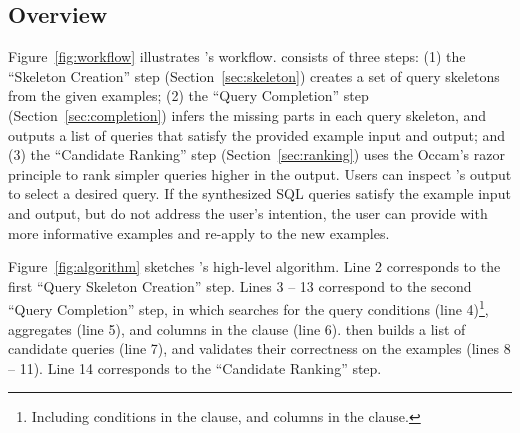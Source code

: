 \subsection{Overview}
\label{sec:algorithm}

\vspace{-1mm}

Figure~\ref{fig:workflow} illustrates \ourtool's workflow.
\ourtool consists of three steps: (1) the ``Skeleton Creation'' step (Section~\ref{sec:skeleton})
creates a set of query skeletons from the given examples;
(2) the ``Query Completion'' step (Section~\ref{sec:completion}) 
infers the missing parts in each query skeleton, and outputs
a list of queries that satisfy
the provided example input and output; and (3) the ``Candidate Ranking'' step (Section~\ref{sec:ranking}) uses the Occam's razor
principle to rank simpler queries higher in the output.
Users can inspect \ourtool's output to select a desired query.
If the synthesized SQL queries satisfy the example input and
output, but do not address the user's intention,
the user can provide \ourtool with more informative examples
and re-apply \ourtool to the new examples.


Figure~\ref{fig:algorithm} sketches \ourtool's high-level algorithm.
Line 2 corresponds to the first ``Query Skeleton
Creation'' step. Lines 3 -- 13 correspond to the second ``Query Completion''
step, in which \ourtool searches for the query conditions (line 4)\footnote{
Including conditions in the  clause,
and columns in the  clause.},
aggregates (line 5), and columns in the  clause (line 6).
\ourtool then builds a list of candidate queries (line 7), and
validates their correctness on the examples (lines 8 -- 11).
Line 14 corresponds to the ``Candidate Ranking'' step.



